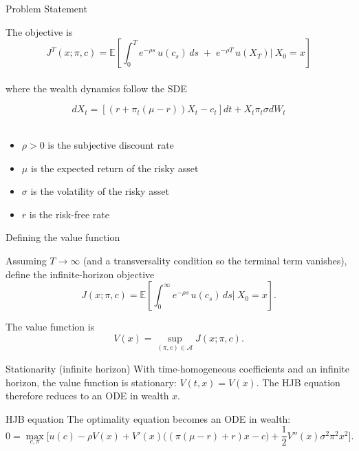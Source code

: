 \documentclass{beamer}
\theoremstyle{definition}
\newcommand{\E}{\mathbb{E}}
\begin{document}
\begin{frame}{Problem Statement}

The objective is
\begin{equation}
J^{T}(x;\pi,c)=\E\!\left[\int_{0}^{T} e^{-\rho s}\,u(c_s)\,ds \;+\; e^{-\rho T}\,u(X_{T})\bigg| \ X_0 = x\right]
\end{equation}\\

where the wealth dynamics follow the SDE

\begin{equation}
dX_t = \left[(r + \pi_t(\mu - r))X_t - c_t\right]dt + X_t \pi_t \sigma dW_t
\end{equation}\\

\begin{itemize}

    \item \(\rho > 0\) is the subjective discount rate
    \item \(\mu\) is the expected return of the risky asset
    \item \(\sigma\) is the volatility of the risky asset
    \item \(r\) is the risk-free rate
\end{itemize}
\end{frame}

\begin{frame}{Defining the value function}

Assuming \(T \to \infty\) (and a transversality condition so the terminal term vanishes), define the infinite-horizon objective
\begin{equation}
J(x;\pi,c)= \E \left[\int_{0}^{\infty} e^{-\rho s}\,u(c_s)\,ds \bigg| \ X_0 = x\right].
\end{equation}

The value function is
\begin{equation}
V(x) = \sup_{(\pi, c) \in \mathcal{A}} J(x;\pi,c).
\end{equation}

\end{frame}


\begin{frame}{Stationarity (infinite horizon)}
With time-homogeneous coefficients and an infinite horizon, the value function is stationary: \(V(t,x)=V(x)\).
The HJB equation therefore reduces to an ODE in wealth \(x\).
\end{frame}

\begin{frame}{HJB equation}
    The optimality equation becomes an ODE in wealth:
    \begin{equation}
    0=\max_{c,\pi}
    \Big[u(c)-\rho V(x)
    +V'(x)\big((\pi(\mu-r)+r)x-c\big)
    +\frac12 V''(x)\sigma^2\pi^2 x^2\Big].
    \end{equation}
\end{frame}
\end{document}
